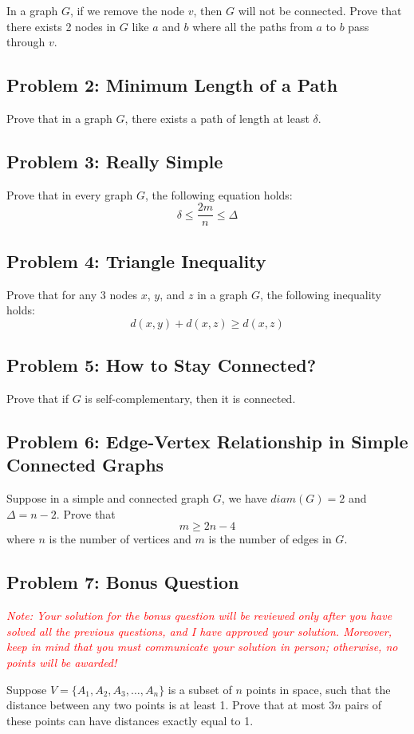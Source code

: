 \documentclass{article}
\begin{document}
In a graph $G$, if we remove the node $v$, then $G$ will not be connected. Prove that there exists 2 nodes in $G$ like $a$ and $b$ where all the paths from $a$ to $b$ pass through $v$.


\subsection*{Problem 2: Minimum Length of a Path}
Prove that in a graph $G$, there exists a path of length at least $\delta$.

\subsection*{Problem 3: Really Simple}
Prove that in every graph $G$, the following equation holds:
\begin{equation*}
\delta \le \frac{2m}{n} \le \Delta
\end{equation*}

\subsection*{Problem 4: Triangle Inequality}
Prove that for any 3 nodes $x$, $y$, and $z$ in a graph $G$, the following inequality holds:
\begin{equation*}
d(x,y) + d(x,z) \ge d(x,z)
\end{equation*}

\subsection*{Problem 5: How to Stay Connected?}
Prove that if $G$ is self-complementary, then it is connected.

\subsection*{Problem 6: Edge-Vertex Relationship in Simple Connected Graphs}
Suppose in a simple and connected graph $G$, we have $diam(G) = 2$ and $\Delta = n - 2$. Prove that
\begin{equation*}
m \ge 2n - 4
\end{equation*}
where $n$ is the number of vertices and $m$ is the number of edges in $G$.

\subsection*{Problem 7: Bonus Question}
\textcolor{red}{\textit{Note: Your solution for the bonus question will be reviewed only after you have solved all the previous questions, and I have approved your solution. Moreover, keep in mind that you must communicate your solution in person; otherwise, no points will be awarded!}}

Suppose $V = \{A_1, A_2, A_3, \ldots, A_n\}$ is a subset of $n$ points in space, such that the distance between any two points is at least 1. Prove that at most $3n$ pairs of these points can have distances exactly equal to 1.
\end{document}
